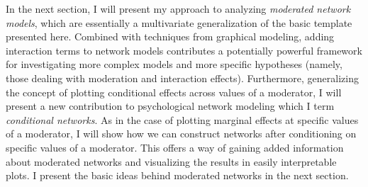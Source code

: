 In the next section, I will present my approach to analyzing \textit{moderated network models}, which are essentially a multivariate generalization of the basic template presented here. Combined with techniques from graphical modeling, adding interaction terms to network models contributes a potentially powerful framework for investigating more complex models and more specific hypotheses (namely, those dealing with moderation and interaction effects). Furthermore, generalizing the concept of plotting conditional effects across values of a moderator, I will present a new contribution to psychological network modeling which I term \textit{conditional networks}. As in the case of plotting marginal effects at specific values of a moderator, I will show how we can construct networks after conditioning on specific values of a moderator. This offers a way of gaining added information about moderated networks and visualizing the results in easily interpretable plots. I present the basic ideas behind moderated networks in the next section.
